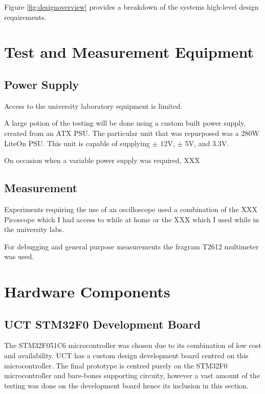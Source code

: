 Figure \ref{fig:designoverview} provides a breakdown of the systems high-level design requirements.



\section{Test and Measurement Equipment}

\subsection{Power Supply}
Access to the university laboratory equipment is limited.

A large potion of the testing will be done using a custom built power supply, created from an ATX PSU. The particular unit that was repurposed was a 280W LiteOn PSU. This unit is capable of supplying $\pm$ 12V, $\pm$ 5V, and 3.3V.

On occasion when a variable power supply was required, XXX

\subsection{Measurement}

Experiments requiring the use of an oscilloscope used a combination of the XXX Picoscope which I had access to while at home or the XXX which I used while in the university labs.

For debugging and general purpose measurements the fragram T2612 multimeter was used.




\section{Hardware Components}

\subsection{UCT STM32F0 Development Board}
The STM32F051C6 microcontroller was chosen due to its combination of low cost and availability. UCT has a custom design development board centred on this microcontroller. The final prototype is centred purely on the STM32F0 microcontroller and bare-bones supporting circuity, however a vast amount of the testing was done on the development board hence its inclusion in this section.

